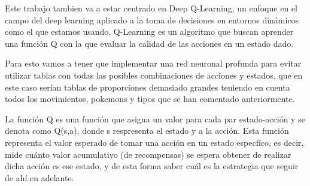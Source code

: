 Este trabajo tambien va a estar centrado en Deep Q-Learning, un enfoque en el campo del deep learning aplicado a la toma de decisiones en entornos dinámicos como el que estamos usando. Q-Learning es un algoritmo que buscan aprender una función Q con la que evaluar la calidad de las acciones en un estado dado.

Para esto vamos a tener que implementar una red neuronal profunda para evitar utilizar tablas con todas las posibles combinaciones de acciones y estados, que en este caso serían tablas de proporciones demasiado grandes teniendo en cuenta todos los movimientos, pokemons y tipos que se han comentado anteriormente. 

La función Q es una función que asigna un valor para cada par estado-acción y se denota como Q(s,a), donde s respresenta el estado y a la acción. Esta función representa el valor esperado de tomar una acción en un estado especfíco, es decir, mide cuánto valor acumulativo (de recompensas) se espera obtener de realizar dicha acción es ese estado, y de esta forma saber cuál es la estrategia que seguir de ahí en adelante.

